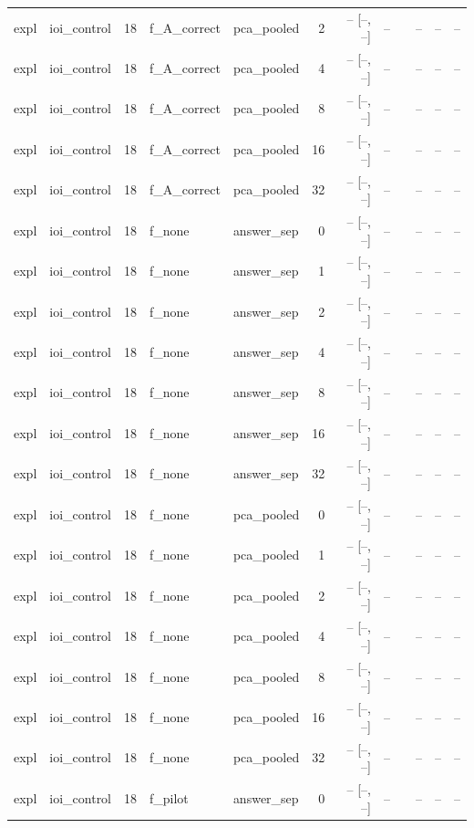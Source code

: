 \begin{tabular}{llrllrrrlrrr}
expl & ioi\_control & 18 & f\_A\_correct & pca\_pooled & 2 & -- [--, --] & -- &  & -- & -- & -- \\
expl & ioi\_control & 18 & f\_A\_correct & pca\_pooled & 4 & -- [--, --] & -- &  & -- & -- & -- \\
expl & ioi\_control & 18 & f\_A\_correct & pca\_pooled & 8 & -- [--, --] & -- &  & -- & -- & -- \\
expl & ioi\_control & 18 & f\_A\_correct & pca\_pooled & 16 & -- [--, --] & -- &  & -- & -- & -- \\
expl & ioi\_control & 18 & f\_A\_correct & pca\_pooled & 32 & -- [--, --] & -- &  & -- & -- & -- \\
expl & ioi\_control & 18 & f\_none & answer\_sep & 0 & -- [--, --] & -- &  & -- & -- & -- \\
expl & ioi\_control & 18 & f\_none & answer\_sep & 1 & -- [--, --] & -- &  & -- & -- & -- \\
expl & ioi\_control & 18 & f\_none & answer\_sep & 2 & -- [--, --] & -- &  & -- & -- & -- \\
expl & ioi\_control & 18 & f\_none & answer\_sep & 4 & -- [--, --] & -- &  & -- & -- & -- \\
expl & ioi\_control & 18 & f\_none & answer\_sep & 8 & -- [--, --] & -- &  & -- & -- & -- \\
expl & ioi\_control & 18 & f\_none & answer\_sep & 16 & -- [--, --] & -- &  & -- & -- & -- \\
expl & ioi\_control & 18 & f\_none & answer\_sep & 32 & -- [--, --] & -- &  & -- & -- & -- \\
expl & ioi\_control & 18 & f\_none & pca\_pooled & 0 & -- [--, --] & -- &  & -- & -- & -- \\
expl & ioi\_control & 18 & f\_none & pca\_pooled & 1 & -- [--, --] & -- &  & -- & -- & -- \\
expl & ioi\_control & 18 & f\_none & pca\_pooled & 2 & -- [--, --] & -- &  & -- & -- & -- \\
expl & ioi\_control & 18 & f\_none & pca\_pooled & 4 & -- [--, --] & -- &  & -- & -- & -- \\
expl & ioi\_control & 18 & f\_none & pca\_pooled & 8 & -- [--, --] & -- &  & -- & -- & -- \\
expl & ioi\_control & 18 & f\_none & pca\_pooled & 16 & -- [--, --] & -- &  & -- & -- & -- \\
expl & ioi\_control & 18 & f\_none & pca\_pooled & 32 & -- [--, --] & -- &  & -- & -- & -- \\
expl & ioi\_control & 18 & f\_pilot & answer\_sep & 0 & -- [--, --] & -- &  & -- & -- & -- \\

\end{tabular}
